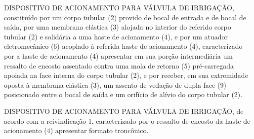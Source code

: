 \begin{quadroreivindicatorio}
\reivindicacao DISPOSITIVO DE ACIONAMENTO PARA VÁLVULA DE IRRIGAÇÃO,
constituído por um corpo tubular (2) provido de bocal de entrada e de bocal de
saída, por uma membrana elástica (3) alojada no interior do referido corpo
tubular (2) e solidária a uma haste de acionamento (4), e por um atuador
eletromecânico (6) acoplado à referida haste de acionamento (4), caracterizado
por a haste de acionamento (4) apresentar em sua porção intermediária um
ressalto de encosto assentado contra uma mola de retorno (5) pré-carregada
apoiada na face interna do corpo tubular (2), e por receber, em sua extremidade
oposta à membrana elástica (3), um assento de vedação de dupla face (9)
posicionado entre o bocal de saída e um orifício de alívio do corpo tubular
(2).

\reivindicacao DISPOSITIVO DE ACIONAMENTO PARA VÁLVULA DE IRRIGAÇÃO, de acordo
com a reivindicação 1, caracterizado por o ressalto de encosto da haste de
acionamento (4) apresentar formato troncônico.

\fi

\end{quadroreivindicatorio}
